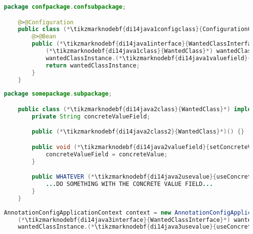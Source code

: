 \begin{lstlisting}[language=Java, title={Configuration class}]
    package confpackage.confsubpackage;

    @>@Configuration
    public class (*\tikzmarknodebf{di14java1configclass}{ConfigurationClass}*) {
        @>@Bean
        public (*\tikzmarknodebf{di14java1interface}{WantedClassInterface}*) (*\tikzmarknodebf{di14java1beanid}{wantedBeanMethod}*)() {
            (*\tikzmarknodebf{di14java1class}{WantedClass}*) wantedClassInstance = new (*\tikzmarknodebf{di14java1class2}{WantedClass}*)();
            wantedClassInstance.(*\tikzmarknodebf{di14java1valuefield}{setConcreteValueField}*)("someValue");
            return wantedClassInstance;
        }
    }
\end{lstlisting}
\begin{lstlisting}[language=Java, title={Wanted class with the zero--parameter constructor and the setter method}]
    package somepackage.subpackage;

    public class (*\tikzmarknodebf{di14java2class}{WantedClass}*) implements (*\tikzmarknodebf{di14java2interface}{WantedClassInterface}*) {
        private String concreteValueField;

        public (*\tikzmarknodebf{di14java2class2}{WantedClass}*)() {}

        public void (*\tikzmarknodebf{di14java2valuefield}{setConcreteValueField}*)(String concreteValue) {
            concreteValueField = concreteValue;
        }

        public WHATEVER (*\tikzmarknodebf{di14java2usevalue}{useConcreteValue}*)() {
            ...DO SOMETHING WITH THE CONCRETE VALUE FIELD...
        }
    }
\end{lstlisting}
\begin{lstlisting}[language=Java, title={Usage}]
    AnnotationConfigApplicationContext context = new AnnotationConfigApplicationContext((*\tikzmarknodebf{di14java3configclass}{ConfigurationClass}*).class);
    (*\tikzmarknodebf{di14java3interface}{WantedClassInterface}*) wantedClassInstance = context.getBean("(*\tikzmarknodebf{di14java3beanid}{wantedBeanMethod}[ForestGreen]*)", (*\tikzmarknodebf{di14java3interface2}{WantedClassInterface}*).class);
    wantedClassInstance.(*\tikzmarknodebf{di14java3usevalue}{useConcreteValue}*)();
\end{lstlisting}
\newpage

